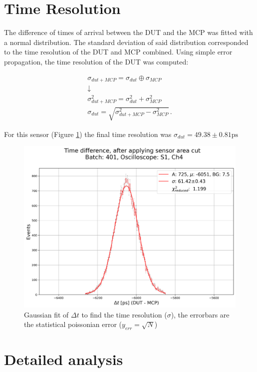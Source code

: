 \section{Time Resolution}\label{sec:time_resolution}

The difference of times of arrival between the DUT and the MCP was fitted with a normal distribution. The standard deviation of said distribution corresponded to the time resolution of the DUT and MCP combined. Using simple error propagation, the time resolution of the DUT was computed: 

\begin{equation*}
    \begin{gathered}
    \sigma_{dut+MCP} = \sigma_{dut} \oplus \sigma_{MCP} \\
    \downarrow \\
    \sigma_{dut+MCP}^2 = \sigma_{dut}^2 + \sigma_{MCP}^2 \\
    \sigma_{dut} = \sqrt{\sigma_{dut+MCP}^2-\sigma_{MCP}^2}  \, .
    \end{gathered}
\end{equation*}

For this sensor (Figure \ref{fig:time_resolution_plot}) the final time resolution was \(\sigma_{dut} = 49.38\pm0.81\si{\ps} \)

\begin{figure}
    \centering
    \includegraphics[width=0.7\linewidth]{Images/time_resolution_plots/time_difference_401_S1_zoomed_and_gauss_fit_with_cuts_central_area_DUTs_3.png}
    \caption{Gaussian fit of $\Delta t$ to find the time resolution ($\sigma$), the errorbars are the statistical poissonian error ($y_{err}=\sqrt{N}$)}
    \label{fig:time_resolution_plot}
\end{figure}



\section{Detailed analysis}\label{sec:detailed_analysis}

